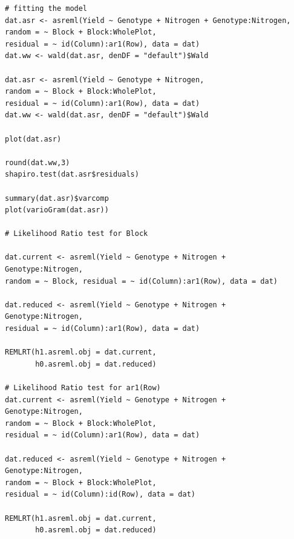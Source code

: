 \documentclass[a4paper, 10pt, fleqn, twosided]{memoir}
\begin{document}
\begin{tcolorbox}[title = Exercise 15 code]
\begin{verbatim}
# fitting the model
dat.asr <- asreml(Yield ~ Genotype + Nitrogen + Genotype:Nitrogen,
random = ~ Block + Block:WholePlot,
residual = ~ id(Column):ar1(Row), data = dat)
dat.ww <- wald(dat.asr, denDF = "default")$Wald

dat.asr <- asreml(Yield ~ Genotype + Nitrogen,
random = ~ Block + Block:WholePlot,
residual = ~ id(Column):ar1(Row), data = dat)
dat.ww <- wald(dat.asr, denDF = "default")$Wald

plot(dat.asr)

round(dat.ww,3)
shapiro.test(dat.asr$residuals)

summary(dat.asr)$varcomp
plot(varioGram(dat.asr))

# Likelihood Ratio test for Block

dat.current <- asreml(Yield ~ Genotype + Nitrogen +
Genotype:Nitrogen,
random = ~ Block, residual = ~ id(Column):ar1(Row), data = dat)

dat.reduced <- asreml(Yield ~ Genotype + Nitrogen +
Genotype:Nitrogen,
residual = ~ id(Column):ar1(Row), data = dat)

REMLRT(h1.asreml.obj = dat.current,
       h0.asreml.obj = dat.reduced)

# Likelihood Ratio test for ar1(Row)
dat.current <- asreml(Yield ~ Genotype + Nitrogen +
Genotype:Nitrogen,
random = ~ Block + Block:WholePlot,
residual = ~ id(Column):ar1(Row), data = dat)

dat.reduced <- asreml(Yield ~ Genotype + Nitrogen +
Genotype:Nitrogen,
random = ~ Block + Block:WholePlot,
residual = ~ id(Column):id(Row), data = dat)

REMLRT(h1.asreml.obj = dat.current,
       h0.asreml.obj = dat.reduced)

\end{verbatim}
\end{tcolorbox}
\end{document}
